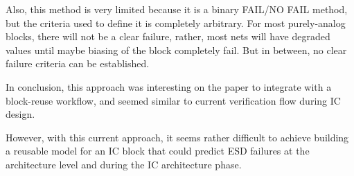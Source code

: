 Also, this method is very limited because it is a binary FAIL/NO FAIL method,
but the criteria used to define it is completely arbitrary.
For most purely-analog blocks, there will not be a clear failure, rather, most
nets will have degraded values until maybe biasing of the block completely fail.
But in between, no clear failure criteria can be established.

In conclusion, this approach was interesting on the paper to integrate with a
block-reuse workflow, and seemed similar to current verification flow during IC design.

However, with this current approach, it seems rather difficult to achieve
building a reusable model for an IC block that could predict ESD failures at
the architecture level and during the IC architecture phase.

